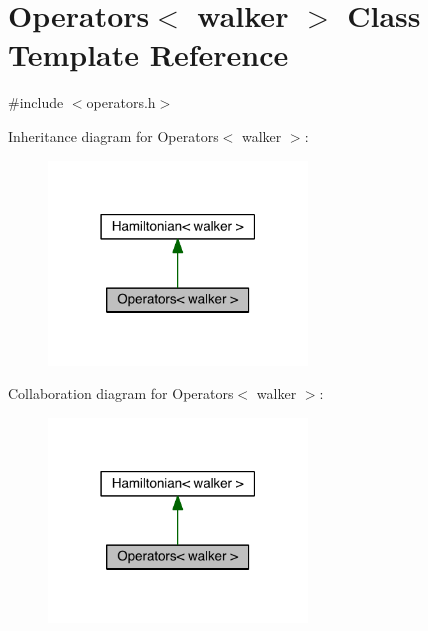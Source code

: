 \hypertarget{class_operators}{\section{Operators$<$ walker $>$ Class Template Reference}
\label{class_operators}
}


{\ttfamily \#include $<$operators.\+h$>$}



Inheritance diagram for Operators$<$ walker $>$\+:
\nopagebreak
\begin{figure}[H]
\begin{center}
\leavevmode
\includegraphics[width=195pt]{class_operators__inherit__graph}
\end{center}
\end{figure}


Collaboration diagram for Operators$<$ walker $>$\+:
\nopagebreak
\begin{figure}[H]
\begin{center}
\leavevmode
\includegraphics[width=195pt]{class_operators__coll__graph}
\end{center}
\end{figure}
